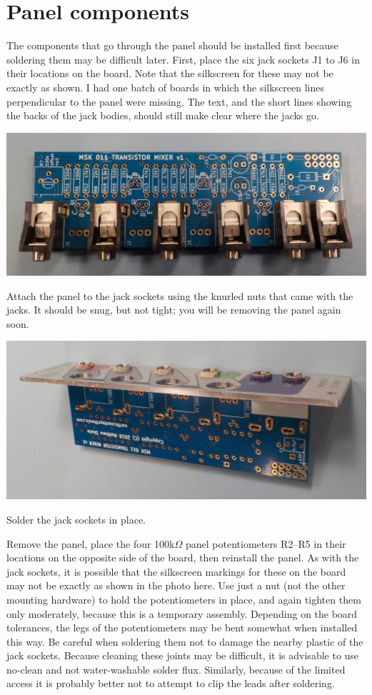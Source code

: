 \pagebreak

\section{Panel components}

The components that go through the panel should be installed first because
soldering them may be difficult later.  First, place the six jack sockets J1
to J6 in their locations on the board.  Note that the silkscreen for these
may not be exactly as shown.  I had one batch of boards in which the
silkscreen lines perpendicular to the panel were missing.  The text, and the
short lines showing the backs of the jack bodies, should still make clear
where the jacks go.

\noindent\includegraphics[width=\linewidth]{jacks.jpg}

Attach the panel to the jack sockets using the knurled nuts that came with
the jacks.  It should be snug, but not tight; you will be removing the panel
again soon.

\noindent\includegraphics[width=\linewidth]{jacks-panel.jpg}

Solder the jack sockets in place.

Remove the panel, place the four 100k$\Omega$ panel potentiometers R2--R5 in
their locations on the opposite side of the board, then reinstall the panel. 
As with the jack sockets, it is possible that the silkscreen markings for
these on the board may not be exactly as shown in the photo here.
Use just a nut (not the other mounting hardware) to hold the potentiometers
in place, and again tighten them only moderately, because this is a
temporary assembly.  Depending on the board tolerances, the legs of the
potentiometers may be bent somewhat when installed this way.  Be careful
when soldering them not to damage the nearby plastic of the jack sockets. 
Because cleaning these joints may be difficult, it is advisable to use
no-clean and not water-washable solder flux.  Similarly, because of the
limited access it is probably better not to attempt to clip the leads after
soldering.


